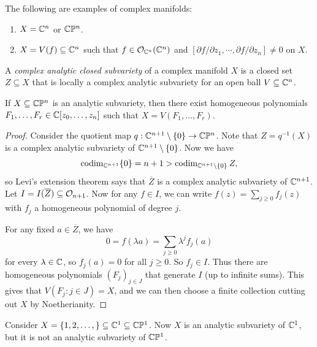 \begin{example}
  The following are examples of complex
  manifolds:
  \begin{enumerate}
    \item $X = \mathbb{C}^n$ or $\mathbb{C} \mathbb{P}^n$.
    \item $X = V(f) \subseteq \mathbb{C}^n$
      such that $f \in \mathcal{O}_{\mathbb{C}^n}(\mathbb{C}^n)$
      and $[\partial f / \partial z_1, \cdots, \partial f / \partial z_n] \ne 0$
      on $X$.
  \end{enumerate}
\end{example}

\begin{definition}
  A \emph{complex analytic closed subvariety}
  of a complex manifold $X$ is a closed
  set $Z \subseteq X$ that is locally a
  complex analytic subvariety for an open
  ball $V \subseteq \mathbb{C}^n$.
\end{definition}

\begin{theorem}\label{thm:chow}
  If $X \subseteq \mathbb{C} \mathbb{P}^n$ is an analytic
  subvariety, then there exist
  homogeneous polynomials
  $F_1, \dots, F_r \in \mathbb{C}[z_0, \dots, z_n]$ 
  such that $X = V(F_1, \dots, F_r)$.
\end{theorem}

\begin{proof}
  Consider the quotient map
  $q : \mathbb{C}^{n + 1} \setminus \{0\} \to \mathbb{C} \mathbb{P}^n$.
  Note that $Z = q^{-1}(X)$ is a complex
  analytic subvariety of $\mathbb{C}^{n + 1} \setminus \{0\}$.
  Now we have
  \[
    \operatorname{codim}_{\mathbb{C}^{n + 1}} \{0\}
    = n + 1 > \operatorname{codim}_{\mathbb{C}^{n + 1} \setminus \{0\}} Z,
  \]
  so Levi's extension theorem says that
  $\overline{Z}$ is a complex analytic
  subvariety of $\mathbb{C}^{n + 1}$.
  Let $I = I(\overline{Z}) \subseteq \mathcal{O}_{n + 1}$.
  Now for any $f \in I$, we can write
  $f(z) = \sum_{j \ge 0} f_j(z)$ with
  $f_j$ a homogeneous polynomial
  of degree $j$.

  For any fixed $a \in \overline{Z}$, we have
  \[
    0 = f(\lambda a)
    = \sum_{j \ge 0} \lambda^j f_j(a)
  \]
  for every $\lambda \in \mathbb{C}$, so
  $f_j(a) = 0$ for all $j \ge 0$. So
  $f_j \in I$.  Thus there are
  homogeneous polynomials $(F_j)_{j \in J}$
  that generate $I$ (up to infinite sums).
  This gives that
  $V(F_j : j \in J) = X$, and
  we can then choose a finite collection
  cutting out $X$ by Noetherianity.
\end{proof}

\begin{example}
  Consider $X = \{1, 2, \dots, \} \subseteq \mathbb{C}^1 \subseteq \mathbb{C} \mathbb{P}^1$.
  Now $X$ is an analytic subvariety of
  $\mathbb{C}^1$, but it is not an analytic
  subvariety of $\mathbb{C} \mathbb{P}^1$.
\end{example}
